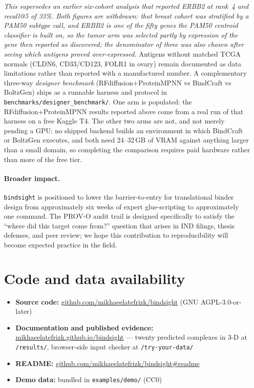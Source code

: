 \documentclass[11pt,letterpaper]{article}
\begin{document}
\textit{This supersedes an earlier six-cohort analysis that reported ERBB2 at
rank~4 and recall@5 of 33\%. Both figures are withdrawn: that breast cohort was
stratified by a PAM50 subtype call, and ERBB2 is one of the fifty genes the PAM50
centroid classifier is built on, so the tumor arm was selected partly by
expression of the gene then reported as discovered; the denominator of three was
also chosen after seeing which antigens proved over-expressed.} Antigens without
matched TCGA normals (CLDN6, CD33/CD123, FOLR1 in ovary) remain documented as
data limitations rather than reported with a manufactured number. A complementary three-way \textit{designer benchmark}
(RFdiffusion+ProteinMPNN vs BindCraft vs BoltzGen) ships as a runnable harness
and protocol in \texttt{benchmarks/designer\_benchmark/}. One arm is populated:
the RFdiffusion+ProteinMPNN results reported above come from a real run of that
harness on a free Kaggle T4. The other two arms are not, and not merely pending
a GPU: no shipped backend builds an environment in which BindCraft or BoltzGen
executes, and both need 24--32\,GB of VRAM against anything larger than a small
domain, so completing the comparison requires paid hardware rather than more of
the free tier.

\paragraph{Broader impact.} \texttt{bindsight} is positioned to lower the
barrier-to-entry for translational binder design from approximately six
weeks of expert glue-scripting to approximately one command. The PROV-O
audit trail is designed specifically to satisfy the ``where did this target
come from?'' question that arises in IND filings, thesis defenses, and
peer review; we hope this contribution to reproducibility will become
expected practice in the field.

\section*{Code and data availability}

\begin{itemize}
  \item \textbf{Source code:} \href{https://github.com/mikhaeelatefrizk/bindsight}{github.com/mikhaeelatefrizk/bindsight} (GNU AGPL-3.0-or-later)
  \item \textbf{Documentation and published evidence:} \href{https://mikhaeelatefrizk.github.io/bindsight/}{mikhaeelatefrizk.github.io/bindsight} --- twenty predicted complexes in 3-D at \texttt{/results/}, browser-side input checker at \texttt{/try-your-data/}
  \item \textbf{README:} \href{https://github.com/mikhaeelatefrizk/bindsight#readme}{github.com/mikhaeelatefrizk/bindsight\#readme}
  \item \textbf{Demo data:} bundled in \texttt{examples/demo/} (CC0)
\end{itemize}
\end{document}
